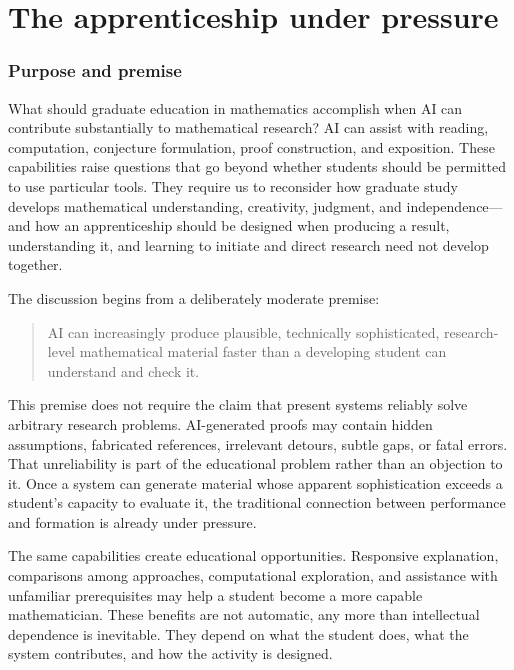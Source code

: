 \documentclass[11pt]{article}
\begin{document}
\part{The apprenticeship under pressure}

\section{Purpose and premise}

What should graduate education in mathematics accomplish when AI can contribute
substantially to mathematical research? AI can assist with reading, computation,
conjecture formulation, proof construction, and exposition. These capabilities raise
questions that go beyond whether students should be permitted to use particular tools.
They require us to reconsider how graduate study develops mathematical understanding,
creativity, judgment, and independence---and how an apprenticeship should be designed
when producing a result, understanding it, and learning to initiate and direct research
need not develop together.

The discussion begins from a deliberately moderate premise:
\vspace{-0.1cm}
\begin{quote}
AI can increasingly produce plausible, technically sophisticated, research-level
mathematical material faster than a developing student can understand and check it.
\end{quote}
\vspace{-0.1cm}

This premise does not require the claim that present systems reliably solve arbitrary
research problems.  AI-generated proofs may contain hidden assumptions, fabricated
references, irrelevant detours, subtle gaps, or fatal errors.  That unreliability is part
of the educational problem rather than an objection to it.  Once a system can generate
material whose apparent sophistication exceeds a student's capacity to evaluate it, the
traditional connection between performance and formation is already under pressure.

The same capabilities create educational opportunities. Responsive explanation,
comparisons among approaches, computational exploration, and assistance with unfamiliar
prerequisites may help a student become a more capable mathematician. These benefits are
not automatic, any more than intellectual dependence is inevitable. They depend on what
the student does, what the system contributes, and how the activity is designed.
\end{document}
